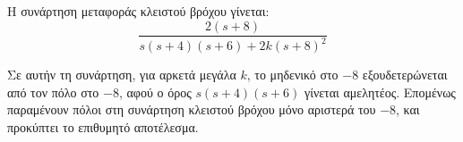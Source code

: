 \documentclass[11pt,a4paper,notitlepage,fleqn,final]{article}
\begin{document}
\begin{exercise}
\begin{enumgreekparen}
\begin{itemize}
    	
    	Η συνάρτηση μεταφοράς κλειστού βρόχου γίνεται:
    	\[
    	\frac{2(s+8)}{s(s+4)(s+6)+2k(s+8)^2}
    	\]
    	
 	    Σε αυτήν τη συνάρτηση, για αρκετά μεγάλα \( k \), το μηδενικό στο \( -8 \) εξουδετερώνεται
 	    από τον πόλο στο \( -8 \), αφού ο όρος \( s(s+4)(s+6) \) γίνεται αμελητέος. Επομένως
 	    παραμένουν πόλοι στη συνάρτηση κλειστού βρόχου μόνο αριστερά του \( -8 \), και προκύπτει
 	    το επιθυμητό αποτέλεσμα.
    \end{itemize}
\end{enumgreekparen}

\hspace{0pt}

\end{exercise}
\end{document}
